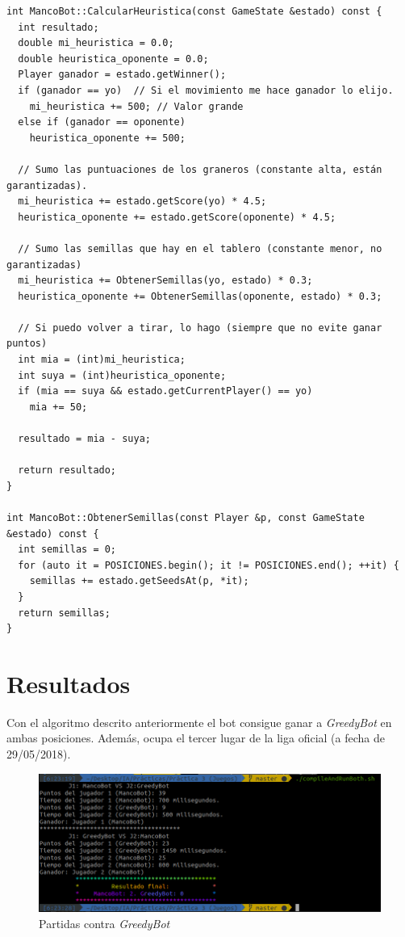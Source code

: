 \documentclass[12pt,spanish]{article}
\begin{document}
\begin{verbatim}
int MancoBot::CalcularHeuristica(const GameState &estado) const {
  int resultado;
  double mi_heuristica = 0.0;
  double heuristica_oponente = 0.0;
  Player ganador = estado.getWinner();
  if (ganador == yo)  // Si el movimiento me hace ganador lo elijo.
    mi_heuristica += 500; // Valor grande
  else if (ganador == oponente)
    heuristica_oponente += 500;

  // Sumo las puntuaciones de los graneros (constante alta, están garantizadas).
  mi_heuristica += estado.getScore(yo) * 4.5;
  heuristica_oponente += estado.getScore(oponente) * 4.5;

  // Sumo las semillas que hay en el tablero (constante menor, no garantizadas)
  mi_heuristica += ObtenerSemillas(yo, estado) * 0.3;
  heuristica_oponente += ObtenerSemillas(oponente, estado) * 0.3;

  // Si puedo volver a tirar, lo hago (siempre que no evite ganar puntos)
  int mia = (int)mi_heuristica;
  int suya = (int)heuristica_oponente;
  if (mia == suya && estado.getCurrentPlayer() == yo)
    mia += 50;
    
  resultado = mia - suya;

  return resultado;
}

int MancoBot::ObtenerSemillas(const Player &p, const GameState &estado) const {
  int semillas = 0;
  for (auto it = POSICIONES.begin(); it != POSICIONES.end(); ++it) {
    semillas += estado.getSeedsAt(p, *it);
  }
  return semillas;
}

\end{verbatim}	



\newpage

\section{Resultados}
Con el algoritmo descrito anteriormente el bot consigue ganar a \emph{GreedyBot} en ambas posiciones. Además, ocupa el tercer lugar de la liga oficial (a fecha de 29/05/2018).

\begin{figure}[H]
\centering
\includegraphics[scale=0.75]{mancovsgreedy.png}
\caption{Partidas contra \emph{GreedyBot}}
\end{figure}
\end{document}
